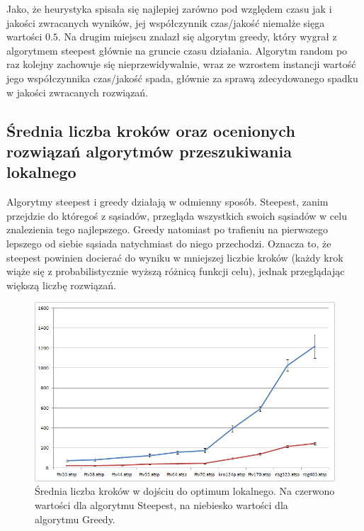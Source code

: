 Jako, że heurystyka spisała się najlepiej zarówno pod względem czasu jak i jakości zwracanych wyników, jej współczynnik czas/jakość niemalże sięga wartości $0.5$. Na drugim miejscu znalazł się algorytm greedy, który wygrał z algorytmem steepest głównie na gruncie czasu działania. Algorytm random po raz kolejny zachowuje się nieprzewidywalnie, wraz ze wzrostem instancji wartość jego współczynnika czas/jakość spada, głównie za sprawą zdecydowanego spadku w jakości zwracanych rozwiązań.

\subsection{Średnia liczba kroków oraz ocenionych rozwiązań algorytmów przeszukiwania lokalnego}
Algorytmy steepest i greedy działają w odmienny sposób. Steepest, zanim przejdzie do któregoś z sąsiadów, przegląda wszystkich swoich sąsiadów w celu znalezienia tego najlepszego. Greedy natomiast po trafieniu na pierwszego lepszego od siebie sąsiada natychmiast do niego przechodzi. Oznacza to, że steepest powinien docierać do wyniku w mniejszej liczbie kroków (każdy krok wiąże się z probabilistycznie wyższą różnicą funkcji celu), jednak przeglądając większą liczbę rozwiązań.

\begin{figure}[!h]
\centering\includegraphics[width=12cm]{img/loc_skoki}
\caption{Średnia liczba kroków w dojściu do optimum lokalnego. Na czerwono wartości dla algorytmu Steepest, na niebiesko wartości dla algorytmu Greedy.}\label{rys:loc_skoki}
\end{figure}

